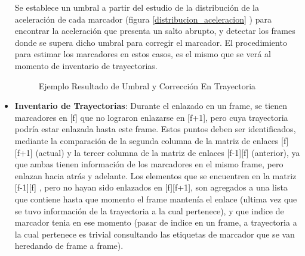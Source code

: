 \begin{itemize}
Se establece un umbral a partir del estudio de la distribución de la aceleración de cada marcador (figura \ref{distribucion_aceleracion} ) para encontrar la aceleración que presenta un salto abrupto, y detectar los frames donde se supera dicho umbral para corregir el marcador. El procedimiento para estimar los marcadores en estos casos, es el mismo que se verá al momento de inventario de trayectorias.
\begin{figure}[H]
 \centering
 \caption{Ejemplo Resultado de Umbral y Corrección En Trayectoria}
\label{distro_acc_track_m13_fix}
\end{figure}
\item \textbf{Inventario de Trayectorias}: Durante el enlazado en un frame, se tienen marcadores en [f] que no lograron enlazarse en [f+1], pero cuya trayectoria podría estar enlazada hasta este frame.
Estos puntos deben ser identificados, mediante la comparación de la segunda columna de la matriz de enlaces [f][f+1] (actual) y la tercer columna de la matriz de enlaces [f-1][f] (anterior), ya que ambas tienen información de los marcadores en el mismo frame, pero enlazan hacia atrás y adelante.
Los elementos que se encuentren en la matriz [f-1][f] , pero no hayan sido enlazados en [f][f+1], son agregados a una lista que  contiene hasta que momento el frame mantenía el enlace (ultima vez que se tuvo información de la trayectoria a la cual pertenece), y que indice de marcador tenia en ese momento (pasar de indice en un frame, a trayectoria a la cual pertenece es trivial consultando las etiquetas de marcador que se van heredando de frame a frame).


\end{itemize}
